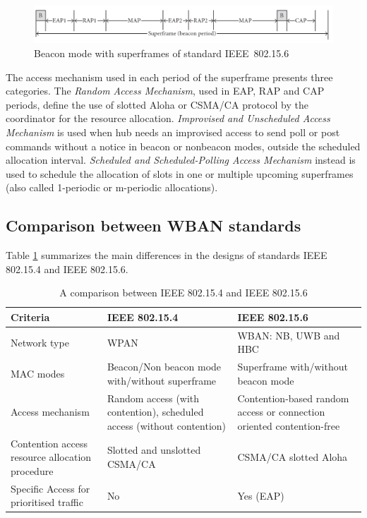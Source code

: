 \documentclass[conference]{IEEEtran}
\begin{document}
\begin{figure}[htbp]
	\centering
	\includegraphics[width=0.9\linewidth]{img/beaconModeSuperframe.png}
	\caption{Beacon mode with superframes of standard IEEE~802.15.6}
	\label{fig_beaconModeSuperframe}
\end{figure}

The access mechanism used in each period of the superframe presents three categories. The \textit{Random Access Mechanism}, used in EAP, RAP and CAP periods, define the use of slotted Aloha or CSMA/CA protocol by the coordinator for the resource allocation. \textit{Improvised and Unscheduled Access Mechanism} is used when hub needs an improvised access to send poll or post commands without a notice in beacon or nonbeacon modes, outside the scheduled allocation interval. \textit{Scheduled and Scheduled-Polling Access Mechanism} instead is used to schedule the allocation of slots in one or multiple upcoming superframes (also called 1-periodic or m-periodic allocations). \cite{kwak2010overview} \cite{ullah2013review}

\subsection{Comparison between WBAN standards}
Table \ref{tab2} \cite{salayma2017wireless} summarizes the main differences in the designs of standards IEEE 802.15.4 and IEEE 802.15.6.

\begin{table}[htbp]
	\caption{A comparison between IEEE 802.15.4 and IEEE 802.15.6}
	\begin{tabularx}{0.5\textwidth}{X|X|X|}
		\textbf{Criteria} & \textbf{IEEE 802.15.4} & \textbf{IEEE 802.15.6} \\
		\hline
		Network type & WPAN &  WBAN: NB, UWB and HBC\\
		\hline
		MAC modes &  Beacon/Non beacon mode with/without superframe & Superframe with/without beacon mode \\
		\hline
		Access mechanism &  Random access (with contention), scheduled access (without contention) & Contention-based random access or connection oriented contention-free \\
		\hline
		Contention access resource allocation procedure	& Slotted and unslotted CSMA/CA & CSMA/CA slotted Aloha \\
		\hline
		Specific Access for prioritised traffic & No & Yes (EAP) \\
		\hline
	\end{tabularx}
	\label{tab2}
\end{table}
\end{document}
